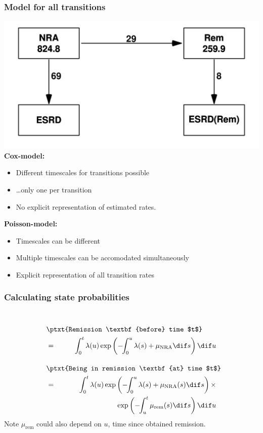 \begin{frame}
   \frametitle{Model for all transitions}
\begin{minipage}[b]{0.49\textwidth}
\raggedright
\includegraphics[width=\textwidth,keepaspectratio]{NRA-death-ann}\\
\textbf{Cox-model:}
\begin{itemize}
\item Different timescales for transitions possible
\item \ldots only one per transition
\item No explicit representation of estimated rates.
\end{itemize}
\end{minipage}
\hfill
\begin{minipage}[b]{0.49\textwidth}
\raggedright
\textbf{Poisson-model:}
\begin{itemize}
\item Timescales can be different
\item Multiple timescales can be accomodated simultaneously
\item Explicit representation of all transition rates
\end{itemize}
\end{minipage}
\end{frame}

\begin{frame}
   \frametitle{Calculating state probabilities}
\ \\[-3em]
\begin{eqnarray*}
 \lefteqn{ \ptxt{Remission \textbf{before} time $t$} } \\ & = &
 \int_0^t \lambda(u) \exp\left( -\!\! \int_0^u \lambda(s) + \mu_\text{NRA} \dif s
          \right) \dif u\\[1em]
 \lefteqn{ \ptxt{Being in remission \textbf{at} time $t$} } \\ & = &
 \int_0^t \lambda(u) \exp\left( -\!\! \int_0^u \lambda(s) +
                                               \mu_\text{NRA}(s) \dif s \right)
                     \times \\ & & \hspace*{8em}
                     \exp\left( -\!\! \int_u^t \mu_\text{rem}(s) \dif s \right)
          \dif u
\end{eqnarray*}
Note $\mu_\text{rem}$ could also depend on $u$, time since obtained remission.
\end{frame}

